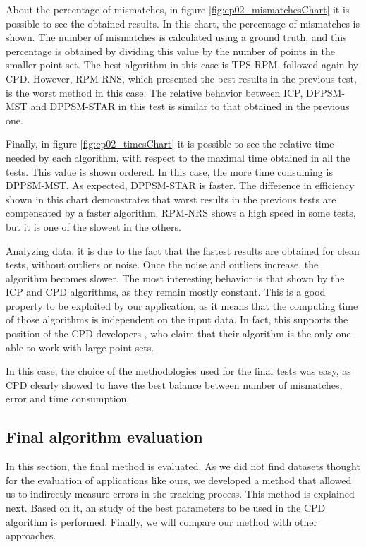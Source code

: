 About the percentage of mismatches, in figure \ref{fig:cp02_mismatchesChart} it is possible to see the obtained results. In 
this chart, the percentage of mismatches is shown. The number of mismatches is calculated using a ground truth, and this 
percentage is obtained by dividing this value by the number of points in the smaller point set. The best algorithm in 
this case is TPS-RPM, followed again by CPD. However, RPM-RNS, which presented the best results in the previous test, 
is the worst method in this case. The relative behavior between ICP, DPPSM-MST and DPPSM-STAR in this test is 
similar to that obtained in the previous one.

Finally, in figure \ref{fig:cp02_timesChart} it is possible to see the relative time needed by each algorithm, with respect to 
the maximal time obtained in all the tests. This value is shown ordered. In this case, the more time consuming is 
DPPSM-MST. As expected, DPPSM-STAR is faster. The difference in efficiency shown in this chart demonstrates that worst 
results in the previous tests are compensated by a faster algorithm. RPM-NRS shows a high speed in some tests, but it is 
one of the slowest in the others. 

Analyzing data, it is due to the fact that the fastest results are obtained for clean 
tests, without outliers or noise. Once the noise and outliers increase, the algorithm becomes slower.
The most interesting behavior is that shown by the ICP and CPD algorithms, as they remain mostly constant. This is a good 
property to be exploited by our application, as it means that the computing time of those algorithms is independent on the input data. In fact, this supports the position of the CPD developers \citep{myronenko2010point}, who claim that their algorithm is 
the only one able to work with large point sets.

In this case, the choice of the methodologies used for the final tests was easy, as CPD clearly showed to have the best balance 
between number of mismatches, error and time consumption.

\subsection{Final algorithm evaluation}\label{ch:chapter02_02_03}

In this section, the final method is evaluated. As we did not find datasets thought for the evaluation of applications like ours, we developed a method that allowed us to indirectly measure errors in the tracking process. This method is explained next. Based on it, an study of the best parameters to be used in the CPD algorithm is performed. Finally, we will compare our method with other approaches.

